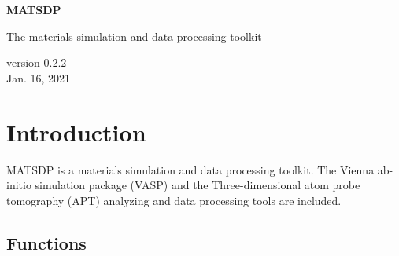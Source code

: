 \documentclass[12pt]{book}
\begin{document}

\begin{titlepage}
\begin{center}
\vspace*{1cm}

\Huge
\textbf{MATSDP}

\vspace{0.5cm}
\LARGE The materials simulation and data processing toolkit
\vspace{1.5cm}

\vfill

\vspace{0.8cm}

\small version 0.2.2\\
\small Jan. 16, 2021

\end{center}
\end{titlepage}

\tableofcontents

\chapter{Introduction}
MATSDP is a materials simulation and data processing toolkit. The Vienna ab-initio simulation package (VASP) and the Three-dimensional atom probe tomography (APT) analyzing and data processing tools are included. 

\section{Functions}
\end{document}

